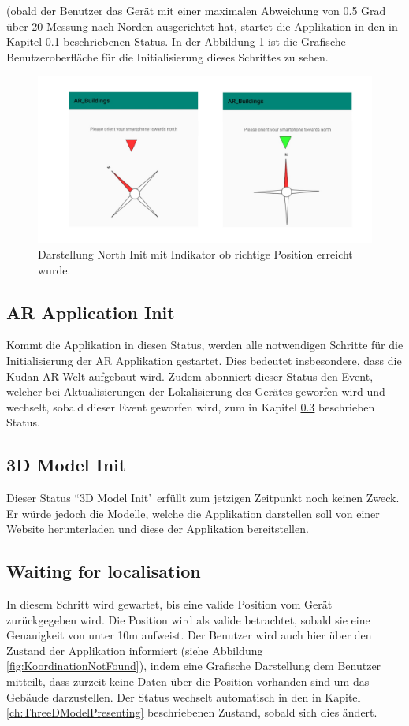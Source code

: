 \documentclass[a4paper]{scrreprt}
\begin{document}
(obald der Benutzer das Gerät mit einer maximalen Abweichung von 0.5 Grad über 20 Messung nach Norden ausgerichtet hat, startet die Applikation in den in Kapitel \ref{ch:ARApplicationInit} beschriebenen Status. In der Abbildung \ref{fig:NorthInitProcess} ist die Grafische Benutzeroberfläche für die Initialisierung dieses Schrittes zu sehen.
\begin{figure}[h!]
	\includegraphics[keepaspectratio, width=\textwidth]{NorthInitProcess.png}
	\caption{Darstellung North Init mit Indikator ob richtige Position erreicht wurde.}
    \label{fig:NorthInitProcess}
\end{figure}

\subsection{AR Application Init} \label{ch:ARApplicationInit}
Kommt die Applikation in diesen Status, werden alle notwendigen Schritte für die Initialisierung der AR Applikation gestartet. Dies bedeutet insbesondere, dass die Kudan AR Welt aufgebaut wird. Zudem abonniert dieser Status den Event, welcher bei Aktualisierungen der Lokalisierung des Gerätes geworfen wird und wechselt, sobald dieser Event geworfen wird, zum in Kapitel \ref{ch:waitingForLocation} beschrieben Status.

\subsection{3D Model Init}
Dieser Status \textquotedblleft 3D Model Init\textquoteright\ erfüllt zum jetzigen Zeitpunkt noch keinen Zweck. Er würde jedoch die Modelle, welche die Applikation darstellen soll von einer Website herunterladen und diese der Applikation bereitstellen.

\subsection{Waiting for localisation} \label{ch:waitingForLocation}
In diesem Schritt wird gewartet, bis eine valide Position vom Gerät zurückgegeben wird. Die Position wird als valide betrachtet, sobald sie eine Genauigkeit von unter 10m aufweist. Der Benutzer wird auch hier über den Zustand der Applikation informiert (siehe Abbildung \ref{fig:KoordinationNotFound}), indem eine Grafische Darstellung dem Benutzer mitteilt, dass zurzeit keine Daten über die Position vorhanden sind um das Gebäude darzustellen. Der Status wechselt automatisch in den in Kapitel \ref{ch:ThreeDModelPresenting} beschriebenen Zustand, sobald sich dies ändert.
\end{document}
